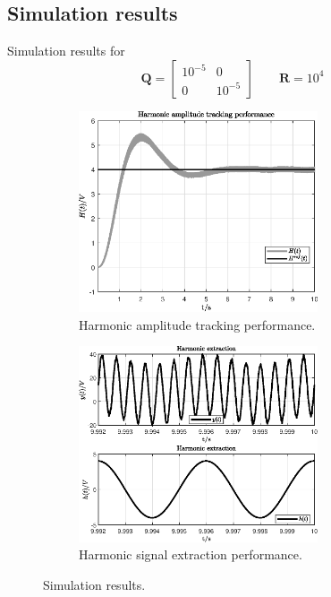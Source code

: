 \documentclass[11pt,a4paper,oneside]{book}
\numberwithin{equation}{section}
\theoremstyle{it}
\theoremstyle{definition}
\begin{document}
\subsection{Simulation results}
Simulation results for 
\begin{equation}
	\mathbf{Q}=\begin{bmatrix}
		10^{-5} & 0 \\ 0 & 10^{-5}
	\end{bmatrix} \qquad \mathbf{R}=10^4
\end{equation}
\begin{figure}[H]
	\centering
	\begin{subfigure}{.5\textwidth}
		\centering
		\includegraphics[width = 200pt, angle=0, 
		keepaspectratio]{figures/shaker/vector/amplitude_track.eps}
		\captionsetup{width=.5\textwidth}
		\caption{Harmonic amplitude tracking performance.}
		\label{}
	\end{subfigure}%
	\begin{subfigure}{.5\textwidth}
		\centering
		\includegraphics[width = 200pt, angle=0, 
		keepaspectratio]{figures/shaker/vector/harmonic_extraction.eps}
		\captionsetup{width=.5\textwidth}
		\caption{Harmonic signal extraction performance.}
		\label{}
	\end{subfigure}
	\caption{Simulation results.}
	\label{}
\end{figure}
\end{document}
